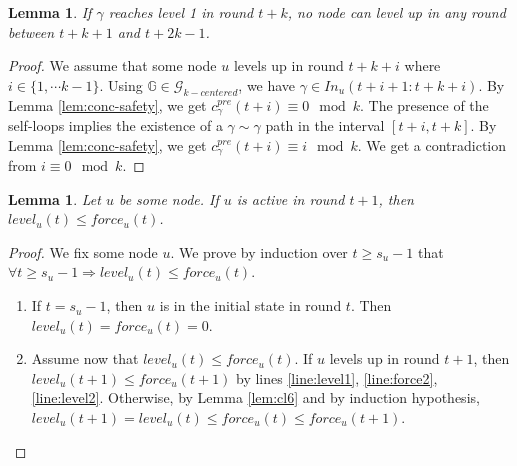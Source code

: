 \documentclass[11pt,letterpaper]{article}
\newtheorem{lem}[thm]{Lemma}
\newcommand{\cent}{\gamma}
\begin{document}
\begin{lem} \label{lem:no-close-level2}
	If $\cent$ reaches level 1 in round $t+k$, no node can level up in any round between $t+k+1$ and $t+2k-1$.
\end{lem}
\begin{proof}
	We assume that some node $u$ levels up in round $t+k+i$ where $i \in \{1, \cdots k-1\}$.
	Using $\mathds{G} \in \mathcal{G}_{k-centered}$, we have $\cent \in In_u(t+i+1:t+k+i)$.
	By Lemma \ref{lem:conc-safety}, we get $c_\cent^{pre}(t+i) \equiv 0 \mod k$.
	The presence of the self-loops implies the existence of a $\cent \sim \cent$ path in the interval $[t+i,t+k]$.
	By Lemma \ref{lem:conc-safety}, we get $c_\cent^{pre}(t+i) \equiv i \mod k$.
	We get a contradiction from $i \equiv 0 \mod k$.
\end{proof}

\begin{lem} \label{lem:greater-force}
	Let $u$ be some node. If $u$ is active in round $t+1$, then $level_u(t) \leq force_u(t)$.
\end{lem}
\begin{proof}
	\noindent We fix some node $u$. We prove by induction over $t \geq s_u-1$ that $\forall t \geq s_u-1 \Rightarrow level_u(t) \leq force_u(t)$.
	\begin{enumerate}
		\item If $t = s_u-1$, then $u$ is in the initial state in round $t$. Then $level_u(t) = force_u(t) = 0$.
		\item Assume now that $level_u(t) \leq force_u(t)$.
			If $u$ levels up in round $t+1$, then $level_u(t+1) \leq force_u(t+1)$ by lines \ref{line:level1}, \ref{line:force2}, \ref{line:level2}.
			Otherwise, by Lemma \ref{lem:cl6} and by induction hypothesis, $level_u(t+1) = level_u(t) \leq force_u(t) \leq force_u(t+1)$.
	\end{enumerate}
\end{proof}
\end{document}
